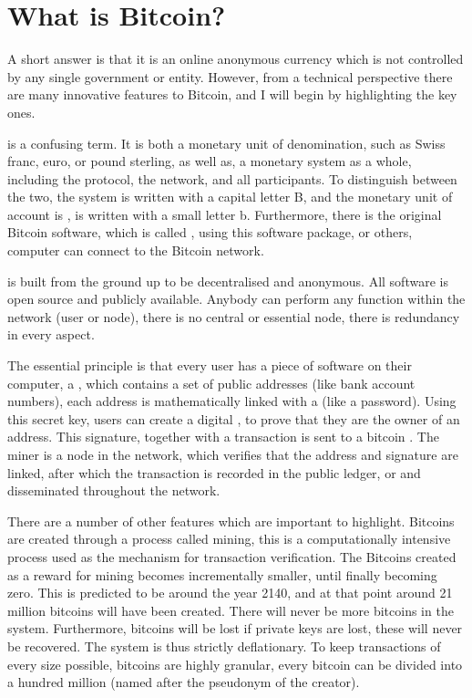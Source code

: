 
\chapter{What is Bitcoin?}

A short answer is that it is an online anonymous currency which is
not controlled by any single government or entity. However, from a
technical perspective there are many innovative features to Bitcoin,
and I will begin by highlighting the key ones. 

is a confusing term. It is both a monetary
unit of denomination, such as Swiss franc, euro, or pound sterling,
as well as, a monetary system as a whole, including the protocol,
the network, and all participants. To distinguish between the two,
the system  is written with a capital letter
B, and the monetary unit of account is ,
is written with a small letter b. Furthermore, there is the original
Bitcoin software, which is called\textbf{ },
using this software package, or others, computer can connect to the
Bitcoin network.

is built from the ground up to be decentralised
and anonymous. All software is open source and publicly available.
Anybody can perform any function within the network (user or node),
there is no central or essential node, there is redundancy in every
aspect.

The essential principle is that every user has a piece of software
on their computer, a\textbf{ }, which contains
a set of public addresses (like bank account numbers), each address
is mathematically linked with a \textbf{}
(like a password). Using this secret key, users can create a digital
, to prove that they are the owner of
an address. This signature, together with a transaction is sent to
a bitcoin \textbf{}. The miner is a node in
the network, which verifies that the address and signature are linked,
after which the transaction is recorded in the public ledger, or \textbf{}
and disseminated throughout the network.

There are a number of other features which are important to highlight.
Bitcoins are created through a process called mining, this is a computationally
intensive process used as the mechanism for transaction verification.
The Bitcoins created as a reward for mining becomes incrementally
smaller, until finally becoming zero. This is predicted to be around
the year 2140, and at that point around 21 million bitcoins will have
been created. There will never be more bitcoins in the system. Furthermore,
bitcoins will be lost if private keys are lost, these will never be
recovered. The system is thus strictly deflationary. To keep transactions
of every size possible, bitcoins are highly granular, every bitcoin
can be divided into a hundred million \textbf{}
(named after the pseudonym of the creator).
